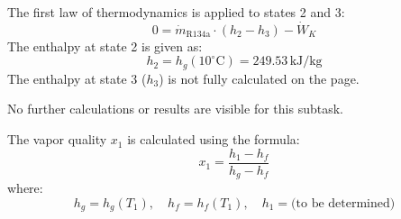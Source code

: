 The first law of thermodynamics is applied to states 2 and 3:  
\[
0 = \dot{m}_{\text{R134a}} \cdot (h_2 - h_3) - \dot{W}_K  
\]
The enthalpy at state 2 is given as:  
\[
h_2 = h_g(10^\circ\text{C}) = 249.53 \, \text{kJ/kg}  
\]  
The enthalpy at state 3 (\(h_3\)) is not fully calculated on the page.  

No further calculations or results are visible for this subtask.

The vapor quality \( x_1 \) is calculated using the formula:  
\[
x_1 = \frac{h_1 - h_f}{h_g - h_f}
\]  
where:  
\[
h_g = h_g(T_1), \quad h_f = h_f(T_1), \quad h_1 = \text{(to be determined)}
\]